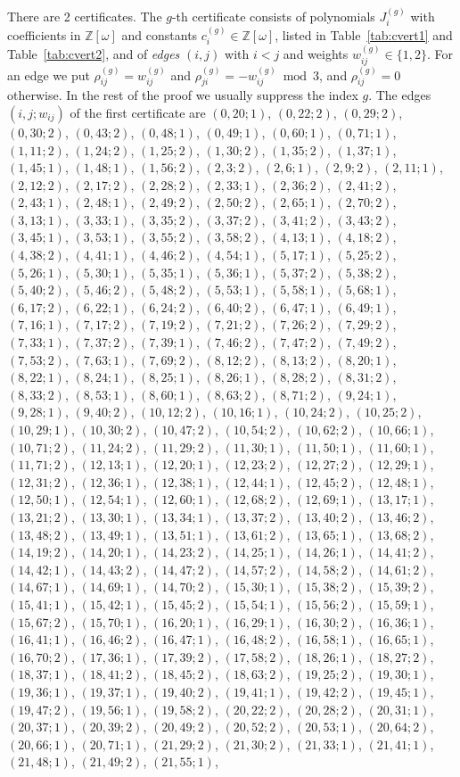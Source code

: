 \documentclass[11pt]{article}
\newcommand{\Z}{\mathbb{Z}}
\begin{document}
There are 2 certificates. The $g$-th certificate consists of polynomials $J^{(g)}_i$ with coefficients in $\Z[\omega]$ and constants $c^{(g)}_i\in\Z[\omega]$, listed in Table~\ref{tab:cvert1} and Table~\ref{tab:cvert2}, and of \emph{edges} $(i,j)$ with $i<j$ and weights $w^{(g)}_{ij}\in\{1,2\}$. For an edge we put $\rho^{(g)}_{ij}=w^{(g)}_{ij}$ and $\rho^{(g)}_{ji}=-w^{(g)}_{ij}\bmod3$, and $\rho^{(g)}_{ij}=0$ otherwise. In the rest of the proof we usually suppress the index $g$.
The edges $(i,j;w_{ij})$ of the first certificate are $(0,20;1)$, $(0,22;2)$, $(0,29;2)$, $(0,30;2)$, $(0,43;2)$, $(0,48;1)$, $(0,49;1)$, $(0,60;1)$, $(0,71;1)$, $(1,11;2)$, $(1,24;2)$, $(1,25;2)$, $(1,30;2)$, $(1,35;2)$, $(1,37;1)$, $(1,45;1)$, $(1,48;1)$, $(1,56;2)$, $(2,3;2)$, $(2,6;1)$, $(2,9;2)$, $(2,11;1)$, $(2,12;2)$, $(2,17;2)$, $(2,28;2)$, $(2,33;1)$, $(2,36;2)$, $(2,41;2)$, $(2,43;1)$, $(2,48;1)$, $(2,49;2)$, $(2,50;2)$, $(2,65;1)$, $(2,70;2)$, $(3,13;1)$, $(3,33;1)$, $(3,35;2)$, $(3,37;2)$, $(3,41;2)$, $(3,43;2)$, $(3,45;1)$, $(3,53;1)$, $(3,55;2)$, $(3,58;2)$, $(4,13;1)$, $(4,18;2)$, $(4,38;2)$, $(4,41;1)$, $(4,46;2)$, $(4,54;1)$, $(5,17;1)$, $(5,25;2)$, $(5,26;1)$, $(5,30;1)$, $(5,35;1)$, $(5,36;1)$, $(5,37;2)$, $(5,38;2)$, $(5,40;2)$, $(5,46;2)$, $(5,48;2)$, $(5,53;1)$, $(5,58;1)$, $(5,68;1)$, $(6,17;2)$, $(6,22;1)$, $(6,24;2)$, $(6,40;2)$, $(6,47;1)$, $(6,49;1)$, $(7,16;1)$, $(7,17;2)$, $(7,19;2)$, $(7,21;2)$, $(7,26;2)$, $(7,29;2)$, $(7,33;1)$, $(7,37;2)$, $(7,39;1)$, $(7,46;2)$, $(7,47;2)$, $(7,49;2)$, $(7,53;2)$, $(7,63;1)$, $(7,69;2)$, $(8,12;2)$, $(8,13;2)$, $(8,20;1)$, $(8,22;1)$, $(8,24;1)$, $(8,25;1)$, $(8,26;1)$, $(8,28;2)$, $(8,31;2)$, $(8,33;2)$, $(8,53;1)$, $(8,60;1)$, $(8,63;2)$, $(8,71;2)$, $(9,24;1)$, $(9,28;1)$, $(9,40;2)$, $(10,12;2)$, $(10,16;1)$, $(10,24;2)$, $(10,25;2)$, $(10,29;1)$, $(10,30;2)$, $(10,47;2)$, $(10,54;2)$, $(10,62;2)$, $(10,66;1)$, $(10,71;2)$, $(11,24;2)$, $(11,29;2)$, $(11,30;1)$, $(11,50;1)$, $(11,60;1)$, $(11,71;2)$, $(12,13;1)$, $(12,20;1)$, $(12,23;2)$, $(12,27;2)$, $(12,29;1)$, $(12,31;2)$, $(12,36;1)$, $(12,38;1)$, $(12,44;1)$, $(12,45;2)$, $(12,48;1)$, $(12,50;1)$, $(12,54;1)$, $(12,60;1)$, $(12,68;2)$, $(12,69;1)$, $(13,17;1)$, $(13,21;2)$, $(13,30;1)$, $(13,34;1)$, $(13,37;2)$, $(13,40;2)$, $(13,46;2)$, $(13,48;2)$, $(13,49;1)$, $(13,51;1)$, $(13,61;2)$, $(13,65;1)$, $(13,68;2)$, $(14,19;2)$, $(14,20;1)$, $(14,23;2)$, $(14,25;1)$, $(14,26;1)$, $(14,41;2)$, $(14,42;1)$, $(14,43;2)$, $(14,47;2)$, $(14,57;2)$, $(14,58;2)$, $(14,61;2)$, $(14,67;1)$, $(14,69;1)$, $(14,70;2)$, $(15,30;1)$, $(15,38;2)$, $(15,39;2)$, $(15,41;1)$, $(15,42;1)$, $(15,45;2)$, $(15,54;1)$, $(15,56;2)$, $(15,59;1)$, $(15,67;2)$, $(15,70;1)$, $(16,20;1)$, $(16,29;1)$, $(16,30;2)$, $(16,36;1)$, $(16,41;1)$, $(16,46;2)$, $(16,47;1)$, $(16,48;2)$, $(16,58;1)$, $(16,65;1)$, $(16,70;2)$, $(17,36;1)$, $(17,39;2)$, $(17,58;2)$, $(18,26;1)$, $(18,27;2)$, $(18,37;1)$, $(18,41;2)$, $(18,45;2)$, $(18,63;2)$, $(19,25;2)$, $(19,30;1)$, $(19,36;1)$, $(19,37;1)$, $(19,40;2)$, $(19,41;1)$, $(19,42;2)$, $(19,45;1)$, $(19,47;2)$, $(19,56;1)$, $(19,58;2)$, $(20,22;2)$, $(20,28;2)$, $(20,31;1)$, $(20,37;1)$, $(20,39;2)$, $(20,49;2)$, $(20,52;2)$, $(20,53;1)$, $(20,64;2)$, $(20,66;1)$, $(20,71;1)$, $(21,29;2)$, $(21,30;2)$, $(21,33;1)$, $(21,41;1)$, $(21,48;1)$, $(21,49;2)$, $(21,55;1)$, 
\end{document}
